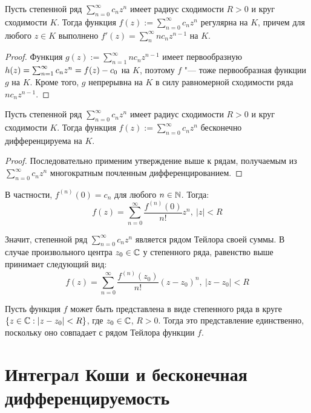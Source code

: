\begin{proposition}
	Пусть степенной ряд $\sum_{n=0}^\infty c_nz^n$ имеет радиус сходимости $R > 0$ и круг сходимости $K$. Тогда функция $f(z) := \sum_{n = 0}^\infty c_nz^{n}$ регулярна на $K$, причем для любого $z \in K$ выполнено $f'(z) = \sum_n^\infty nc_nz^{n-1}$ на $K$.
\end{proposition}

\begin{proof}
	Функция $g(z) := \sum_{n = 1}^\infty nc_nz^{n-1}$ имеет первообразную $h(z) = \sum_{n=1}^\infty c_nz^n \hm= f(z) - c_0$ на $K$, поэтому $f$ "--- тоже первообразная функции $g$ на $K$. Кроме того, $g$ непрерывна на $K$ в силу равномерной сходимости ряда $nc_nz^{n-1}$.
\end{proof}

\begin{corollary}
	Пусть степенной ряд $\sum_{n=0}^\infty c_nz^n$ имеет радиус сходимости $R > 0$ и круг сходимости $K$. Тогда функция $f(z) := \sum_{n = 0}^\infty c_nz^{n}$ бесконечно дифференцируема на $K$.
\end{corollary}

\begin{proof}
	Последовательно применим утверждение выше к рядам, получаемым из $\sum_{n=0}^\infty c_nz^n$ многократным почленным дифференцированием.
\end{proof}

\begin{note}
	В частности, $f^{(n)}(0) = c_n$ для любого $n \in \mathbb{N}$. Тогда:
	\[f(z) = \sum_{n=0}^\infty \frac{f^{(n)}(0)}{n!}z^n,~|z| < R\]
		
	Значит, степенной ряд $\sum_{n=0}^\infty c_nz^n$ является рядом Тейлора своей суммы. В случае произвольного центра $z_0 \in \mathbb{C}$ у степенного ряда, равенство выше принимает следующий вид:
	\[f(z) = \sum_{n=0}^\infty \frac{f^{(n)}(z_0)}{n!}(z - z_0)^n,~|z - z_0| < R\]
\end{note}

\begin{note}
	Пусть функция $f$ может быть представлена в виде степенного ряда в круге $\{z \in \mathbb{C} : |z - z_0| < R\}$, где $z_0 \in \mathbb{C}$, $R > 0$. Тогда это представление единственно, поскольку оно совпадает с рядом Тейлора функции $f$.
\end{note}

\section{Интеграл Коши и бесконечная дифференцируемость}

